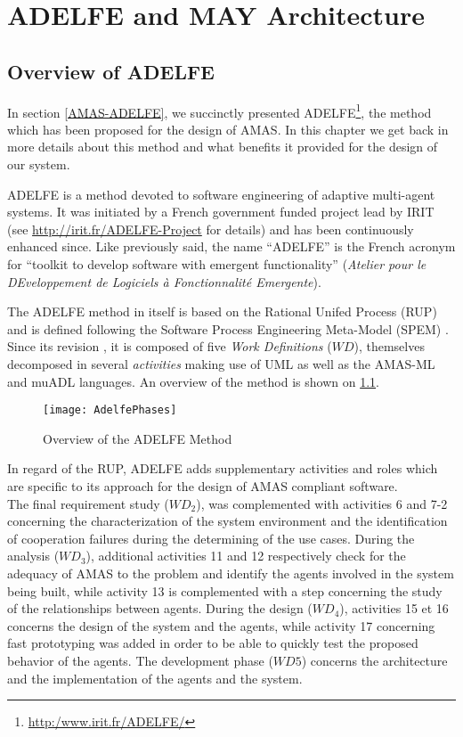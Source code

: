 \chapter{ADELFE and MAY Architecture}\label{ADELFE_chapter}

\section{Overview of ADELFE}

In section \ref{AMAS-ADELFE}, we succinctly presented ADELFE\footnote{\url{http:/www.irit.fr/ADELFE/}}, the method which has been proposed for the design of AMAS. In this chapter we get back in more details about this method and what benefits it provided for the design of our system. 

ADELFE is a method devoted to software engineering of adaptive multi-agent systems. It was initiated by a French government funded project lead by IRIT (see \url{http://irit.fr/ADELFE-Project} for details) and has been continuously enhanced since. Like previously said, the name \enquote{ADELFE} is the French acronym for \enquote{toolkit to develop software with emergent functionality} (\textit{Atelier pour le DEveloppement de Logiciels à Fonctionnalité Emergente}).

The ADELFE method in itself is based on the Rational Unifed Process (RUP) and is defined following the Software Process Engineering Meta-Model (SPEM) \cite{PiGl2004.1,BeCaGlPi2005.1}. Since its revision \cite{Ro2008.3}, it is composed of five \emph{Work Definitions} ($WD$), themselves decomposed in several \emph{activities} making use of UML as well as the AMAS-ML and muADL languages. An overview of the method is shown on \figurename{} \ref{ADELFE_phases}.

\begin{figure}
\centering
\texttt{[image: AdelfePhases]}
\caption{Overview of the ADELFE Method}\label{ADELFE_phases}
\end{figure}

In regard of the RUP, ADELFE adds supplementary activities and roles which are specific to its approach for the design of AMAS compliant software.\\
The final requirement study ($WD_2$), was complemented with activities 6 and 7-2 concerning the characterization of the system environment and the identification of cooperation failures during the determining of the use cases. During the analysis ($WD_3$), additional activities 11 and 12 respectively check for the adequacy of AMAS to the problem and identify the agents involved in the system being built, while activity 13 is complemented with a step concerning the study of the relationships between agents. During the design ($WD_4$), activities 15 et 16 concerns the design of the system and the agents, while activity 17 concerning fast prototyping was added in order to be able to quickly test the proposed behavior of the agents. The development phase ($WD5$) concerns the architecture and the implementation of the agents and the system.

